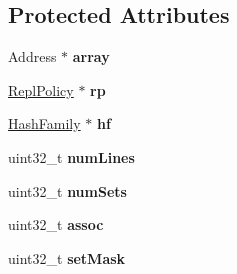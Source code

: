 \subsection*{Protected Attributes}
\begin{DoxyCompactItemize}
\item 
\hypertarget{classSetAssocArray_a6f6574dcffe354f1290ccf4fcdd9a741}{Address $\ast$ {\bfseries array}}\label{classSetAssocArray_a6f6574dcffe354f1290ccf4fcdd9a741}

\item 
\hypertarget{classSetAssocArray_a3813880d714488960297ac9923f77608}{\hyperlink{classReplPolicy}{Repl\-Policy} $\ast$ {\bfseries rp}}\label{classSetAssocArray_a3813880d714488960297ac9923f77608}

\item 
\hypertarget{classSetAssocArray_aa80b2621a9454e9ccd3f7262e6b3ac90}{\hyperlink{classHashFamily}{Hash\-Family} $\ast$ {\bfseries hf}}\label{classSetAssocArray_aa80b2621a9454e9ccd3f7262e6b3ac90}

\item 
\hypertarget{classSetAssocArray_a0ad0ef2f3f45f7c41813d2e16777f917}{uint32\-\_\-t {\bfseries num\-Lines}}\label{classSetAssocArray_a0ad0ef2f3f45f7c41813d2e16777f917}

\item 
\hypertarget{classSetAssocArray_a9b6e72aef33bbec18e20f90ae9a4316d}{uint32\-\_\-t {\bfseries num\-Sets}}\label{classSetAssocArray_a9b6e72aef33bbec18e20f90ae9a4316d}

\item 
\hypertarget{classSetAssocArray_a3ec1554ca492e72bd2ca456df335a68b}{uint32\-\_\-t {\bfseries assoc}}\label{classSetAssocArray_a3ec1554ca492e72bd2ca456df335a68b}

\item 
\hypertarget{classSetAssocArray_a5dfa66ea48924b742a2baf4c6d10b13f}{uint32\-\_\-t {\bfseries set\-Mask}}\label{classSetAssocArray_a5dfa66ea48924b742a2baf4c6d10b13f}

\end{DoxyCompactItemize}


